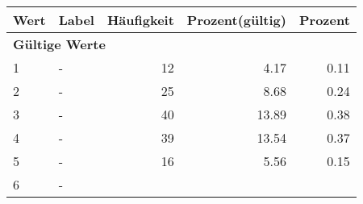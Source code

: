      \begin{longtable}{lXrrr}
     \toprule
     \textbf{Wert} & \textbf{Label} & \textbf{Häufigkeit} & \textbf{Prozent(gültig)} & \textbf{Prozent} \\
     \endhead
     \midrule
     \multicolumn{5}{l}{\textbf{Gültige Werte}}\\

     1 &
     \multicolumn{1}{X}{ -  } &


       \num{12} &
       \num[round-mode=places,round-precision=2]{4,17} &
         \num[round-mode=places,round-precision=2]{0,11} \\

     2 &
     \multicolumn{1}{X}{ -  } &


       \num{25} &
       \num[round-mode=places,round-precision=2]{8,68} &
         \num[round-mode=places,round-precision=2]{0,24} \\

     3 &
     \multicolumn{1}{X}{ -  } &


       \num{40} &
       \num[round-mode=places,round-precision=2]{13,89} &
         \num[round-mode=places,round-precision=2]{0,38} \\

     4 &
     \multicolumn{1}{X}{ -  } &


       \num{39} &
       \num[round-mode=places,round-precision=2]{13,54} &
         \num[round-mode=places,round-precision=2]{0,37} \\

     5 &
     \multicolumn{1}{X}{ -  } &


       \num{16} &
       \num[round-mode=places,round-precision=2]{5,56} &
         \num[round-mode=places,round-precision=2]{0,15} \\

     6 &
     \multicolumn{1}{X}{ -  } &



\end{longtable}
